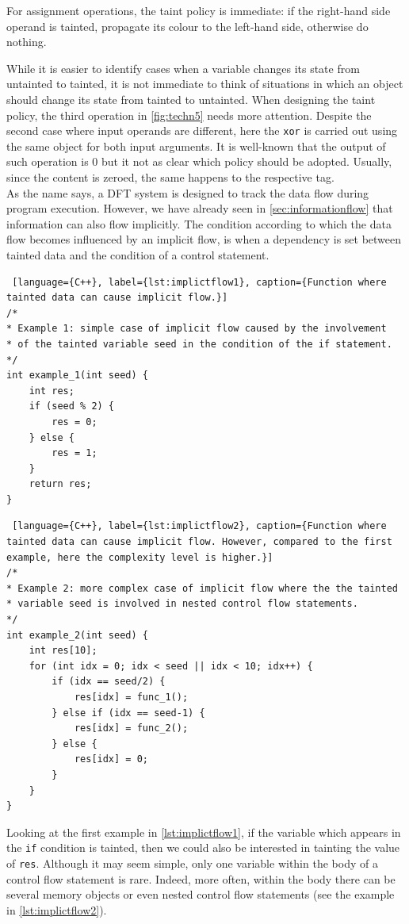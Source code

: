\documentclass[LaM,binding=0.6cm]{sapthesis}
\begin{document}
For assignment operations, the taint policy is immediate: if the right-hand side operand is tainted, propagate its colour to the left-hand side, otherwise do nothing.

While it is easier to identify cases when a variable changes its state from untainted to tainted, it is not immediate to think of situations in which an object should change its state from tainted to untainted. When designing the taint policy, the third operation in \autoref{fig:techn5} needs more attention. Despite the second case where input operands are different, here the \texttt{xor} is carried out using the same object for both input arguments. It is well-known that the output of such operation is $0$ but it not as clear which policy should be adopted. Usually, since the content is zeroed, the same happens to the respective tag.\\

\noindent
As the name says, a DFT system is designed to track the data flow during program execution. However, we have already seen in \autoref{sec:informationflow} that information can also flow implicitly. The condition according to which the data flow becomes influenced by an implicit flow, is when a dependency is set between tainted data and the condition of a control statement.

\begin{lstlisting} [language={C++}, label={lst:implictflow1}, caption={Function where tainted data can cause implicit flow.}]
/*
* Example 1: simple case of implicit flow caused by the involvement
* of the tainted variable seed in the condition of the if statement.
*/
int example_1(int seed) {
	int res;
	if (seed % 2) {
		res = 0;
	} else {
		res = 1;
	}
	return res;
}
\end{lstlisting}
\clearpage
\begin{lstlisting} [language={C++}, label={lst:implictflow2}, caption={Function where tainted data can cause implicit flow. However, compared to the first example, here the complexity level is higher.}]
/*
* Example 2: more complex case of implicit flow where the the tainted
* variable seed is involved in nested control flow statements.
*/
int example_2(int seed) {
	int res[10];
	for (int idx = 0; idx < seed || idx < 10; idx++) {
		if (idx == seed/2) {
			res[idx] = func_1();
		} else if (idx == seed-1) {
			res[idx] = func_2();
		} else {
			res[idx] = 0;
		}	
	}
}
\end{lstlisting}

\noindent
Looking at the first example in \autoref{lst:implictflow1}, if the variable which appears in the \texttt{if} condition is tainted, then we could also be interested in tainting the value of \texttt{res}. Although it may seem simple, only one variable within the body of a control flow statement is rare. Indeed, more often, within the body there can be several memory objects or even nested control flow statements (see the example in \autoref{lst:implictflow2}).
\end{document}
